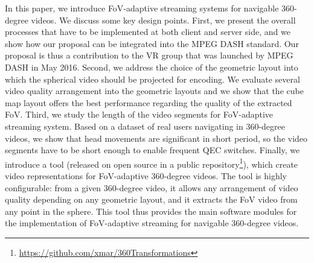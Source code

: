 In this paper, we introduce \ac{FoV}-adaptive streaming systems for navigable 360-degree
videos. 
We discuss some key design points. First, we present the overall processes that have to
be implemented at both client and server side, and we show how our proposal can be integrated
into the MPEG \ac{DASH} standard. Our proposal is thus a contribution to the 
\ac{VR} group that was launched by MPEG \ac{DASH} in May 2016.
Second, we address the choice of the geometric layout into which the spherical video should
be projected for encoding. We evaluate 
several video quality arrangement into the geometric layouts and we show that the
cube map layout offers the best performance regarding the quality of the extracted
\ac{FoV}.
Third, we study  the length of the video segments
for \ac{FoV}-adaptive streaming system. Based on a dataset of
real users navigating in 360-degree videos, we show that head movements are significant
in short period, so the video segments have to be short enough to enable
frequent \ac{QEC} switches.
Finally, we introduce a tool (released on open source in a public
repository\footnote{\url{https://github.com/xmar/360Transformations}}),
which create video representations for
\ac{FoV}-adaptive 360-degree videos.
The tool is highly configurable: from a given 360-degree video, it allows
any arrangement of video quality depending on any geometric layout, and it
extracts the
\ac{FoV} video from any point in the sphere. This tool thus provides the
main software modules for the implementation of \ac{FoV}-adaptive streaming
for navigable 360-degree videos.


%
%
%
%



